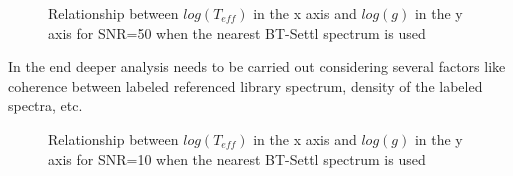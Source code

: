{\clearpage 

\begin{figure}
 \begin{center}
 \caption{Relationship between $log(T_{eff}) $ in the x axis 
 and $log(g)$ in the y axis for SNR=50 when 
 the nearest BT-Settl spectrum is used}
 \label{fig:lg_lt_ch_50}
 \end{center}
\end{figure}

In the end deeper analysis needs to be carried out considering
several factors like coherence between labeled referenced 
library spectrum, density of the labeled spectra, etc.

\begin{figure}
 \begin{center}
 \caption{Relationship between $log(T_{eff}) $ in the x axis 
 and $log(g)$ in the y axis for SNR=10 when 
 the nearest BT-Settl spectrum is used}
 \label{fig:lg_lt_ch_10}
 \end{center}
\end{figure}


}
